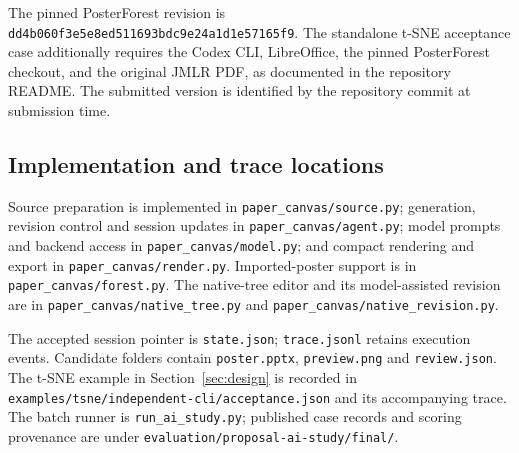 \documentclass{article}
\begin{document}
The pinned PosterForest revision is \texttt{dd4b060f3e5e8ed511693bdc9e24a1d1e57165f9}. The standalone t-SNE acceptance case additionally requires the Codex CLI, LibreOffice, the pinned PosterForest checkout, and the original JMLR PDF, as documented in the repository README. The submitted version is identified by the repository commit at submission time.

\subsection{Implementation and trace locations}
Source preparation is implemented in \texttt{paper\_canvas/source.py}; generation, revision control and session updates in \texttt{paper\_canvas/agent.py}; model prompts and backend access in \texttt{paper\_canvas/model.py}; and compact rendering and export in \texttt{paper\_canvas/render.py}. Imported-poster support is in \texttt{paper\_canvas/forest.py}. The native-tree editor and its model-assisted revision are in \texttt{paper\_canvas/native\_tree.py} and \texttt{paper\_canvas/native\_revision.py}.

The accepted session pointer is \texttt{state.json}; \texttt{trace.jsonl} retains execution events. Candidate folders contain \texttt{poster.pptx}, \texttt{preview.png} and \texttt{review.json}. The t-SNE example in Section~\ref{sec:design} is recorded in \texttt{examples/tsne/independent-cli/acceptance.json} and its accompanying trace. The batch runner is \texttt{run\_ai\_study.py}; published case records and scoring provenance are under \texttt{evaluation/proposal-ai-study/final/}.
\end{document}
